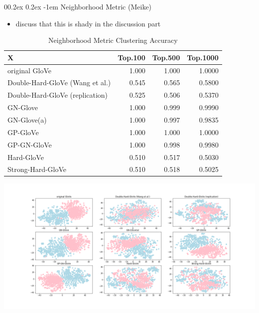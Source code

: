 \documentclass[
  english,
  man,floatsintext]{apa6}
\makeatletter
\providecommand{\tightlist}{%
  \setlength{\itemsep}{0pt}\setlength{\parskip}{0pt}}
\let\oldparagraph\paragraph
\renewcommand{\paragraph}[1]{\oldparagraph{#1}\mbox{}}
\renewcommand{\paragraph}{\@startsection{paragraph}{4}{\parindent}%
  {0\baselineskip \@plus 0.2ex \@minus 0.2ex}%
  {-1em}%
  {\normalfont\normalsize\bfseries\itshape\typesectitle}}
\makeatother
\begin{document}
\hypertarget{neighborhood-metric-meike}{%
\paragraph{Neighborhood Metric (Meike)}\label{neighborhood-metric-meike}}

\begin{itemize}
\tightlist
\item
  discuss that this is shady in the discussion part
\end{itemize}

\begin{table}

\caption{\label{tab:unnamed-chunk-3}Neighborhood Metric Clustering Accuracy}
\centering
\begin{tabular}[t]{l|r|r|r}
\hline
X & Top.100 & Top.500 & Top.1000\\
\hline
original GloVe & 1.000 & 1.000 & 1.0000\\
\hline
Double-Hard-GloVe (Wang et al.) & 0.545 & 0.565 & 0.5800\\
\hline
Double-Hard-GloVe (replication) & 0.525 & 0.506 & 0.5370\\
\hline
GN-Glove & 1.000 & 0.999 & 0.9990\\
\hline
GN-Glove(a) & 1.000 & 0.997 & 0.9835\\
\hline
GP-GloVe & 1.000 & 1.000 & 1.0000\\
\hline
GP-GN-GloVe & 1.000 & 0.998 & 0.9980\\
\hline
Hard-GloVe & 0.510 & 0.517 & 0.5030\\
\hline
Strong-Hard-GloVe & 0.510 & 0.518 & 0.5025\\
\hline
\end{tabular}
\end{table}

\includegraphics{evaluation_results/results_tsne.png}
\end{document}
